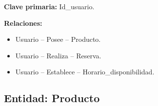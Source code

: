 \documentclass[12pt]{article} %
\begin{document}
\textbf{Clave primaria:} Id\_usuario.

\textbf{Relaciones:}
\begin{itemize}
    \item Usuario -- Posee -- Producto.
    \item Usuario -- Realiza -- Reserva.
    \item Usuario -- Establece -- Horario\_disponibilidad.
\end{itemize}



\subsection{Entidad: Producto}
\end{document}
